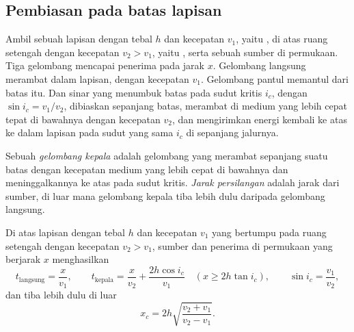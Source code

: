 \subsection{Pembiasan pada batas lapisan}

Ambil sebuah lapisan dengan tebal $h$ dan kecepatan $v_1$, yaitu , di atas ruang setengah dengan kecepatan $v_2 > v_1$, yaitu , serta sebuah sumber di permukaan. Tiga gelombang mencapai penerima pada jarak $x$. Gelombang langsung merambat dalam lapisan, dengan kecepatan $v_1$. Gelombang pantul memantul dari batas itu. Dan sinar yang menumbuk batas pada sudut kritis $i_c$, dengan $\sin i_c = v_1/v_2$, dibiaskan sepanjang batas, merambat di medium yang lebih cepat tepat di bawahnya dengan kecepatan $v_2$, dan mengirimkan energi kembali ke atas ke dalam lapisan pada sudut yang sama $i_c$ di sepanjang jalurnya.

\begin{definition}\label{def:b1:layered-earth:head-wave}
Sebuah \emph{gelombang kepala} adalah gelombang yang merambat sepanjang suatu batas dengan kecepatan medium yang lebih cepat di bawahnya dan meninggalkannya ke atas pada sudut kritis. \emph{Jarak persilangan} adalah jarak dari sumber, di luar mana gelombang kepala tiba lebih dulu daripada gelombang langsung.
\end{definition}

\begin{theorem}\label{thm:b1:layered-earth:two-layer}
Di atas lapisan dengan tebal $h$ dan kecepatan $v_1$ yang bertumpu pada ruang setengah dengan kecepatan $v_2 > v_1$, sumber dan penerima di permukaan yang berjarak $x$ menghasilkan
\[
  t_{\text{langsung}} = \frac{x}{v_1}, \qquad
  t_{\text{kepala}} = \frac{x}{v_2} + \frac{2h\cos i_c}{v_1}
  \quad (x \ge 2h\tan i_c), \qquad \sin i_c = \frac{v_1}{v_2},
\]
dan  tiba lebih dulu di luar 
\[
  x_c = 2h\sqrt{\frac{v_2 + v_1}{v_2 - v_1}}.
\]
\end{theorem}

